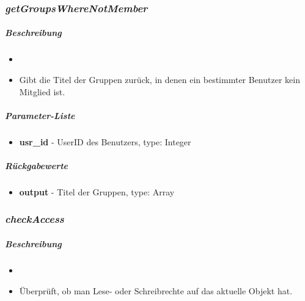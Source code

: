 \subsubsection*{\textit{getGroupsWhereNotMember}}\label{getGroupsWhereNotMemberMGUI}
\subparagraph{Beschreibung}
\begin{itemize}
	\item[] \noindent{} 
	\item[] Gibt die Titel der Gruppen zurück, in denen ein bestimmter Benutzer kein Mitglied ist.
\end{itemize}
\subparagraph{Parameter-Liste}
\begin{itemize}
	\item[] \textbf{usr\_id} - UserID des Benutzers, type: Integer
\end{itemize}
\subparagraph{Rückgabewerte}
\begin{itemize}
	\item[] \textbf{output} - Titel der Gruppen, type: Array
\end{itemize}

\subsubsection*{\textit{checkAccess}}\label{checkAccessMGUI}
\subparagraph{Beschreibung}
\begin{itemize}
	\item[] \noindent{} 
	\item[] Überprüft, ob man Lese- oder Schreibrechte auf das aktuelle Objekt hat.
\end{itemize}